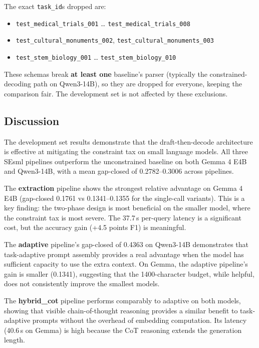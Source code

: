 \documentclass{ceurart}
\begin{document}
The exact \texttt{task\_id}s dropped are:

\begin{itemize}
\item \texttt{test\_medical\_trials\_001} \ldots{} \texttt{test\_medical\_trials\_008}
\item \texttt{test\_cultural\_monuments\_002}, \texttt{test\_cultural\_monuments\_003}
\item \texttt{test\_stem\_biology\_001} \ldots{} \texttt{test\_stem\_biology\_010}
\end{itemize}

These schemas break \textbf{at least one} baseline's parser (typically the
constrained-decoding path on Qwen3-14B), so they are dropped for everyone, keeping the
comparison fair.
The development set is not affected by these exclusions.

\subsection{Discussion}

The development set results demonstrate that the draft-then-decode architecture is
effective at mitigating the constraint tax on small language models.
All three SEsml pipelines outperform the unconstrained baseline on both
Gemma 4 E4B and Qwen3-14B, with a mean gap-closed of 0.2782--0.3006 across pipelines.

The \textbf{extraction} pipeline shows the strongest relative advantage on
Gemma 4 E4B (gap-closed 0.1761 vs 0.1341--0.1355 for the single-call variants).
This is a key finding: the two-phase design is most beneficial on the smaller model,
where the constraint tax is most severe.
The 37.7\,s per-query latency is a significant cost, but the accuracy gain
(+4.5 points F1) is meaningful.

The \textbf{adaptive} pipeline's gap-closed of 0.4363 on Qwen3-14B demonstrates that
task-adaptive prompt assembly provides a real advantage when the model has sufficient
capacity to use the extra context.
On Gemma, the adaptive pipeline's gain is smaller (0.1341), suggesting that the
1400-character budget, while helpful, does not consistently improve the smallest models.

The \textbf{hybrid\_cot} pipeline performs comparably to adaptive on both models,
showing that visible chain-of-thought reasoning provides a similar benefit to
task-adaptive prompts without the overhead of embedding computation.
Its latency (40.6\,s on Gemma) is high because the CoT reasoning extends the generation
length.
\end{document}
